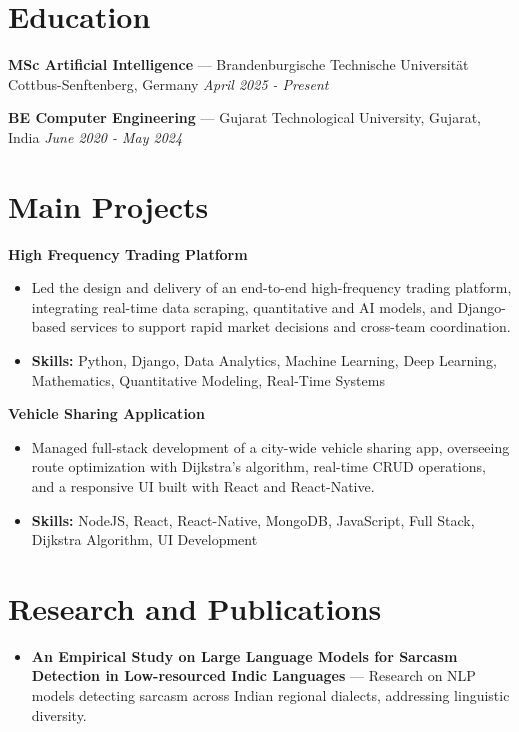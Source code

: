\documentclass[a4paper,10pt]{article}
\begin{document}
\section*{Education}
\textbf{MSc Artificial Intelligence} — Brandenburgische Technische Universität Cottbus-Senftenberg, Germany \hfill \textit{April 2025 - Present}\par
\vspace{1.5pt}
\textbf{BE Computer Engineering} — Gujarat Technological University, Gujarat, India \hfill \textit{June 2020 - May 2024}\par

\section*{Main Projects}
\textbf{High Frequency Trading Platform}\par
\vspace{1pt}
\begin{itemize}
  \item Led the design and delivery of an end-to-end high-frequency trading platform, integrating real-time data scraping, quantitative and AI models, and Django-based services to support rapid market decisions and cross-team coordination.
  \item \textbf{Skills:} Python, Django, Data Analytics, Machine Learning, Deep Learning, Mathematics, Quantitative Modeling, Real-Time Systems
\end{itemize}
\vspace{3pt}
\textbf{Vehicle Sharing Application}\par
\vspace{1pt}
\begin{itemize}
  \item Managed full-stack development of a city-wide vehicle sharing app, overseeing route optimization with Dijkstra's algorithm, real-time CRUD operations, and a responsive UI built with React and React-Native.
  \item \textbf{Skills:} NodeJS, React, React-Native, MongoDB, JavaScript, Full Stack, Dijkstra Algorithm, UI Development
\end{itemize}

\section*{Research and Publications}
\begin{itemize}
\item \textbf{An Empirical Study on Large Language Models for Sarcasm Detection in Low-resourced Indic Languages} — Research on NLP models detecting sarcasm across Indian regional dialects, addressing linguistic diversity.
\end{itemize}
\end{document}
